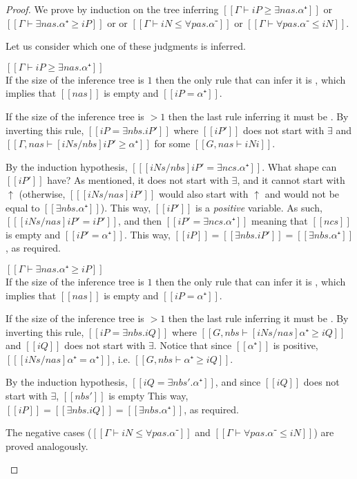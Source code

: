 \lemmaVarSubt*
\begin{proof}
  We prove by induction on the tree
  inferring $[[Γ ⊢ iP ≥ ∃nas.α⁺]]$ or $[[Γ ⊢ ∃nas.α⁺ ≥ iP ]]$ or
  or $[[Γ ⊢ iN ≤ ∀pas.α⁻]]$ or $[[Γ ⊢ ∀pas.α⁻ ≤ iN ]]$.

  Let us consider which one of these judgments is inferred.
  \begin{caseof}
  \item $[[Γ ⊢ iP ≥ ∃nas.α⁺]]$\\
    If the size of the inference tree is $1$ then the only rule that can infer
    it is , which
    implies that $[[nas]]$ is empty and $[[iP = α⁺]]$.

    If the size of the inference tree is $>1$ then the last rule inferring
    it must be . By inverting this rule,
    $[[iP = ∃nbs.iP']]$ where $[[iP']]$ does not start with $\exists$ and
    $[[Γ, nas ⊢ [iNs/nbs] iP' ≥ α⁺]]$ for some $[[G, nas ⊢ iNi]]$.

    By the induction hypothesis, $[[ [iNs/nbs] iP' = ∃ncs.α⁺]]$.
    What shape can $[[iP']]$ have?
    As mentioned, it does not start with $\exists$, and it cannot start with
    $\uparrow$ (otherwise, $[[ [iNs/nas] iP' ]]$ would also
    start with $\uparrow$ and would not be equal to $[[∃nbs.α⁺]]$).
    This way, $[[iP']]$ is a \emph{positive} variable. 
    As such, $[[ [iNs/nas] iP' = iP']]$,
    and then $[[iP' = ∃ncs.α⁺]]$ meaning that $[[ncs]]$ is empty and $[[iP' = α⁺]]$.
    This way, $[[iP]] = [[∃nbs.iP']] = [[∃nbs.α⁺]]$, as required.

  \item $[[Γ ⊢ ∃nas.α⁺ ≥ iP]]$\\
    If the size of the inference tree is $1$ then the only rule that can infer
    it is , which
    implies that $[[nas]]$ is empty and $[[iP = α⁺]]$.

    If the size of the inference tree is $>1$ then the last rule inferring
    it must be . By inverting this rule,
    $[[iP = ∃nbs.iQ]]$ where $[[G, nbs ⊢ [iNs/nas]α⁺ ≥ iQ]]$ and $[[iQ]]$ 
    does not start with $\exists$.
    Notice that since $[[α⁺]]$ is positive, $[[ [iNs/nas]α⁺ = α⁺]]$, 
    i.e. $[[G, nbs ⊢ α⁺ ≥ iQ]]$.

    By the induction hypothesis, $[[iQ = ∃nbs'.α⁺]]$,
    and since $[[iQ]]$ does not start with $\exists$, $[[nbs']]$ is empty
    This way, $[[iP]] = [[∃nbs.iQ]] = [[∃nbs.α⁺]]$, as required.

  \item The negative cases ($[[Γ ⊢ iN ≤ ∀pas.α⁻]]$ and $[[Γ ⊢ ∀pas.α⁻ ≤ iN ]]$)
    are proved analogously.
  \end{caseof}
\end{proof}

